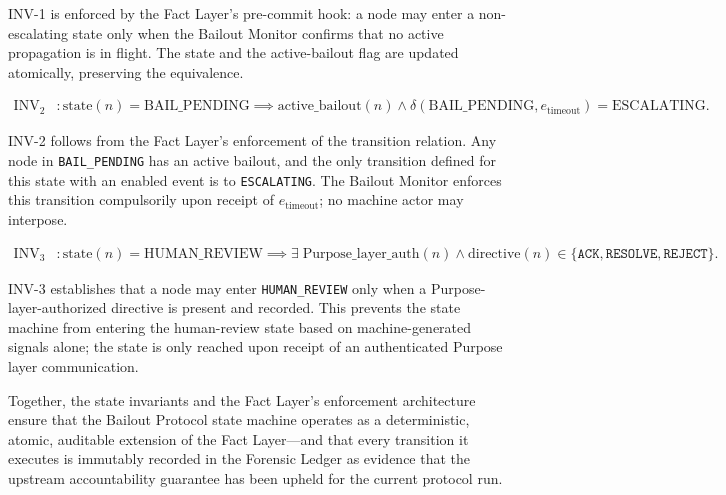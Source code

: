 INV-1 is enforced by the Fact Layer's pre-commit hook: a node may enter a non-escalating state only when the Bailout Monitor confirms that no active propagation is in flight. The state and the active-bailout flag are updated atomically, preserving the equivalence.

\begin{align}
\mathrm{INV}_2 &: \mathrm{state}(n) = \mathrm{BAIL\_PENDING} \implies \mathrm{active\_bailout}(n) \land \delta(\mathrm{BAIL\_PENDING}, e_{\mathrm{timeout}}) = \mathrm{ESCALATING}. \tag{INV-2}
\end{align}

INV-2 follows from the Fact Layer's enforcement of the transition relation. Any node in \texttt{BAIL\_PENDING} has an active bailout, and the only transition defined for this state with an enabled event is to \texttt{ESCALATING}. The Bailout Monitor enforces this transition compulsorily upon receipt of $e_{\mathrm{timeout}}$; no machine actor may interpose.

\begin{align}
\mathrm{INV}_3 &: \mathrm{state}(n) = \mathrm{HUMAN\_REVIEW} \implies \exists\; \mathrm{Purpose\_layer\_auth}(n) \land \mathrm{directive}(n) \in \{\texttt{ACK}, \texttt{RESOLVE}, \texttt{REJECT}\}. \tag{INV-3}
\end{align}

INV-3 establishes that a node may enter \texttt{HUMAN\_REVIEW} only when a Purpose-layer-authorized directive is present and recorded. This prevents the state machine from entering the human-review state based on machine-generated signals alone; the state is only reached upon receipt of an authenticated Purpose layer communication.

Together, the state invariants and the Fact Layer's enforcement architecture ensure that the Bailout Protocol state machine operates as a deterministic, atomic, auditable extension of the Fact Layer---and that every transition it executes is immutably recorded in the Forensic Ledger as evidence that the upstream accountability guarantee has been upheld for the current protocol run.
